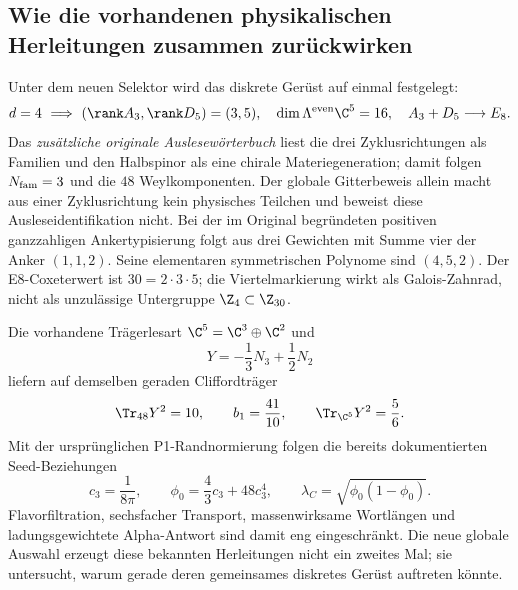 \subsection{Wie die vorhandenen physikalischen Herleitungen zusammen zurückwirken}

Unter dem neuen Selektor wird das diskrete Gerüst auf einmal festgelegt:
\[
 d=4\ \Longrightarrow\
 (\rank A_3,\rank D_5)=(3,5),\quad
 \dim\Lambda^{\rm even}\C^5=16,\quad
 A_3+D_5\longrightarrow E_8.
\]
Das \emph{zusätzliche originale Auslesewörterbuch} liest die drei Zyklusrichtungen als Familien und den Halbspinor als eine chirale Materiegeneration; damit folgen $N_{\rm fam}=3$ und die $48$ Weylkomponenten. Der globale Gitterbeweis allein macht aus einer Zyklusrichtung kein physisches Teilchen und beweist diese Ausleseidentifikation nicht.
Bei der im Original begründeten positiven ganzzahligen Ankertypisierung folgt aus drei Gewichten mit Summe vier der Anker $(1,1,2)$. Seine elementaren symmetrischen Polynome sind $(4,5,2)$. Der E8-Coxeterwert ist $30=2\cdot3\cdot5$; die Viertelmarkierung wirkt als Galois-Zahnrad, nicht als unzulässige Untergruppe $\Z_4\subset\Z_{30}$.

Die vorhandene Trägerlesart $\C^5=\C^3\oplus\C^2$ und
\[
 Y=-\frac13N_3+\frac12N_2
\]
liefern auf demselben geraden Cliffordträger
\[
 \Tr_{48}Y^2=10,\qquad b_1=\frac{41}{10},\qquad
 \Tr_{\C^5}Y^2=\frac56.
\]
Mit der ursprünglichen P1-Randnormierung folgen die bereits dokumentierten Seed-Beziehungen
\[
 c_3=\frac1{8\pi},\qquad
 \phi_0=\frac43c_3+48c_3^4,
 \qquad\lambda_C=\sqrt{\phi_0(1-\phi_0)}.
\]
Flavorfiltration, sechsfacher Transport, massenwirksame Wortlängen und ladungsgewichtete Alpha-Antwort sind damit eng eingeschränkt. Die neue globale Auswahl erzeugt diese bekannten Herleitungen nicht ein zweites Mal; sie untersucht, warum gerade deren gemeinsames diskretes Gerüst auftreten könnte.

